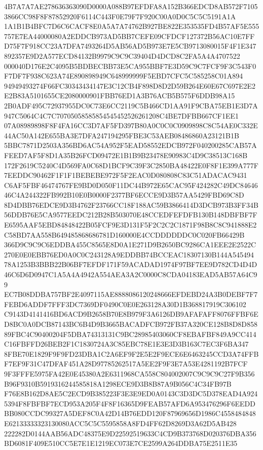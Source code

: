 \documentclass[UTF8,fontset=fandol,zihao=-4,a4paper]{ctexart}
\begin{document}
{{4B7A7A7AE278636363090D0000A088B97EFDFA8A152B366EDCD8AB572F71053866CC98F8F87852920F6114C443F0E79F7F920C00A0D0C5C5C5191A1A
1A1B1B4BFC7D6C6CACF8E0A5A7A74762B927BE822E353535FD4B57AF5E555757E7EA44000080A2EDDCB973AD5BB7CEFE09CFDCF127372B56AC10E7FF
D75F7F918CC23A7DFA7493264D5AB56AD5B973E7E5CB9713080015F4F1E347892357E9D2A577ECD84132B9979C9C9C39404D4DCD8C2FA5A4A4707522
000040D176E2C4095B5BDBECBB73E5CA955BBF7E3D59C9C7FCF9F3C543F0F7DF7F938C623A74E890898949C648999999F5EBD7CFC5C585258C01A894
94949493274F66FC30343434147E3C12CB4F898D8D2D59B264E60E67C697E2E2E2B83A5101655CE2080000901FBB76ED1A3B76ACB5B575F6DDB98A15
2B0ADF495C72937955DC0C73E6CC2119C5B466CD1AA91F9CBA75EB1E3D7A947C5064C4C7C70705058585854545452526261208C4BE7DFBB667CF1EE1
07A08989898F8F4FA16CC3D7AF5FD397B80A0C0C0C0909898C8C54AE0C332E44AC50A142E655BA3E7DFA247194295FBE3C53AEB08486860A23121B1B
5BBC7871D2503A356BD6AC54A952F5EAD58552EDCB972F040200285CAB57AFEED7AF5F8D1A35B26FCD09472E1B1B9B23478E90983C4D9C38513C168B
172F2619C5240C4D569FA0C68D1BCF9C39F3C2850BA48422E0F8F1E399A777F7EEDDC90462F1F1F1BEBEBE972F5F2EAC0D080808C83C51ADACAC9431
C6AF5FBF46474767FE9BD0D050F11DC44B972E65CAC95F424282C49DC8464646C4A244322FB992B10E0B0000F2377BF6ECCE9D3B57AA5429FBD69C8D
8D4DBB76EDCE9D3B4762F23766CC18F188AC59B3866414D3DCB973B3FF34B56DDB76E5CA9577EEDC212B28B503070E48CCEDFEFDFB130B148DBFBF7F
E6595AAF5EBD84848422B05FCF9E3D131F5F2C2C2C1871F98B8C8C941888E2C58BD7AA558B649485868686781D160000E4CCDDDDDDC0C020FB66429B
366D9C9C9C6EDDBA455C8565E8D0A1E271D9B2650BC9286CA1EEE2E2522C270E0E0EBB76ED0A0C0C243128A9EDDBB74BCCEAC18307130B144A545494
78A1253B3BBB22B06BF7EFDF171F59ACADAD1974F97BF7EE9D782CD4D4D46C6D6D0947C1A5A4A4942A554AEA3A2C0000C8CDA04183EAD5AB57A64C99
EC7B08DDBA757BF2E4097115AE8888086120248666EFDEBD24A3B0DEBF7F7FEBD6ADDF7FFF3DC7369DF0490C0E0E263128A30D1B368817919C306102
C9143D4141416BD6ACD9B2658B70E8B979F3A6126DB9AFAFAFF8076FFBF6ED8BC0A0DCB87143BC6B4D9B3665BACADFCB972FB37A320CE128B8D8D858
89FBC4C90400204F5DBA74313131C9BC28985403060CF8EBAFBF849A9CC414C16FBFFD26BEB2F1C1830724A3C85EBC78E1E3E3D3B163C7EC3F6BA347
8FBE70E1829F9F9FD23DBA1C2A6EF9F2E5E2F9ECE6E6463245CCD3A74FFBF7EF9F31C47DFAF451A28D97785262517A5EE2F9F3E7A53E4281192B7FCF
9F3FFFE5975FA42E0E45380A2E6311968CA558C804002007C9C9C9C27F9B356B96F9310B5919316244585818A1298ECE9D3B8B87A9B056C4C34FB97B
F76E8B162D8AE5C2ECD9B385223F3E3E9ED0A0143C3D3DC5D378EAD4A9245394F8FBFBF7ECD953A205F4F8F16365D9FEAB57AFD6A953476296F6EEDD
BB080CCDC99327A5DEF8C0A42D14B76EDD120F87969656D1986C4558484848E62133333323130080ACC5C5C5595858A8FD4FF62D8269D3A62D5AB428
222282D0144AAB56ADC48375E9D22592519633C4CD9B373768D020376DBA356BD6081F409E510CC5E7E1E1219EC073E7CE2599A264DDBA75E2511E35
}}
\end{document}
